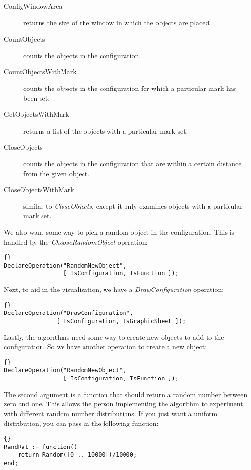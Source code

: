 \documentclass[12pt,a4paper]{book}  %
\begin{document}
\begin{description}
\item[ConfigWindowArea] returns the size of the window in which the
objects are placed.
\item[CountObjects] counts the objects in the configuration.
\item[CountObjectsWithMark] counts the objects in the configuration
for which a particular mark has been set.
\item[GetObjectsWithMark] returns a list of the objects with a
particular mark set.
\item[CloseObjects] counts the objects in the configuration that are
within a certain distance from the given object.
\item[CloseObjectsWithMark] similar to \emph{CloseObjects}, except it only
examines objects with a particular mark set.
\end{description}

We also want some way to pick a random object in the configuration.
This is handled by the \emph{ChooseRandomObject} operation:

\begin{lstlisting}{}
DeclareOperation("RandomNewObject",
                 [ IsConfiguration, IsFunction ]);
\end{lstlisting}

Next, to aid in the visualisation, we have a \emph{DrawConfiguration}
operation:

\begin{lstlisting}{}
DeclareOperation("DrawConfiguration",
               [ IsConfiguration, IsGraphicSheet ]);
\end{lstlisting}

Lastly, the algorithms need some way to create new objects to add to
the configuration.  So we have another operation to create a new
object:

\begin{lstlisting}{}
DeclareOperation("RandomNewObject",
                 [ IsConfiguration, IsFunction ]);
\end{lstlisting}

The second argument is a function that should return a random number
between zero and one.  This allows the person implementing the
algorithm to experiment with different random number distributions.
If you just want a uniform distribution, you can pass in the following
function:

\begin{lstlisting}{}
RandRat := function()
    return Random([0 .. 10000])/10000;
end;
\end{lstlisting}
\end{document}
